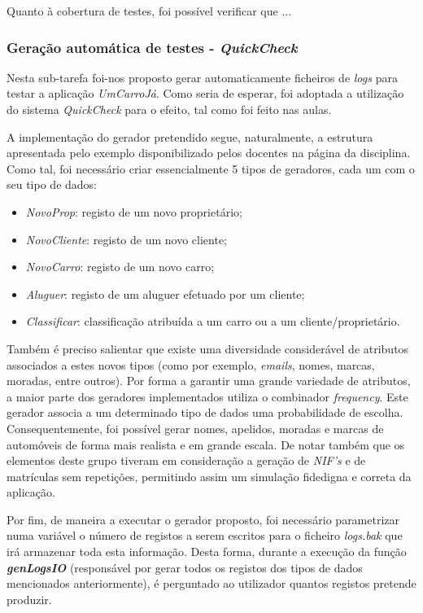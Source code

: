 \documentclass[a4paper]{report}
\begin{document}
Quanto à cobertura de testes, foi possível verificar que ...

\subsubsection{Geração automática de testes - \textit{QuickCheck}}
Nesta sub-tarefa foi-nos proposto gerar automaticamente ficheiros de \textit{logs} para testar a aplicação \textit{UmCarroJá}. Como seria de esperar, foi adoptada a utilização do sistema \textit{QuickCheck} para o efeito, tal como foi feito nas aulas.

A implementação do gerador pretendido segue, naturalmente, a estrutura apresentada pelo exemplo disponibilizado pelos docentes na página da disciplina. Como tal, foi necessário criar essencialmente 5 tipos de geradores, cada um com o seu tipo de dados:
\begin{itemize}
    \item \textit{NovoProp}: registo de um novo proprietário;
    \item \textit{NovoCliente}: registo de um novo cliente;
    \item \textit{NovoCarro}: registo de um novo carro;
    \item \textit{Aluguer}: registo de um aluguer efetuado por um cliente;
    \item \textit{Classificar}: classificação atribuída a um carro ou a um cliente/proprietário.
\end{itemize}

Também é preciso salientar que existe uma diversidade considerável de atributos associados a estes novos tipos (como por exemplo, \textit{emails}, nomes, marcas, moradas, entre outros). Por forma a garantir uma grande variedade de atributos, a maior parte dos geradores implementados utiliza o combinador \textit{frequency}. Este gerador associa a um determinado tipo de dados uma probabilidade de escolha. Consequentemente, foi possível gerar nomes, apelidos, moradas e marcas de automóveis de forma mais realista e em grande escala. De notar também que os elementos deste grupo tiveram em consideração a geração de \textit{NIF's} e de matrículas sem repetições, permitindo assim um simulação fidedigna e correta da aplicação.

Por fim, de maneira a executar o gerador proposto, foi necessário parametrizar numa variável o número de registos a serem escritos para o ficheiro \textit{logs.bak} que irá armazenar toda esta informação. Desta forma, durante a execução da função \textbf{\textit{genLogsIO}} (responsável por gerar todos os registos dos tipos de dados mencionados anteriormente), é perguntado ao utilizador quantos registos pretende produzir.
\end{document}
